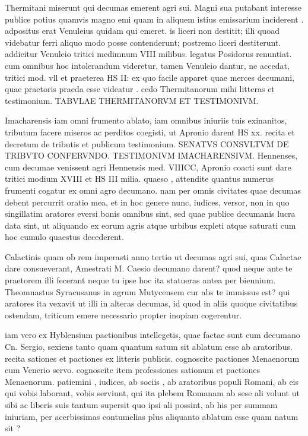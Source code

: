  Thermitani miserunt qui decumas emerent agri sui. Magni sua putabant interesse publice potius quamvis magno emi quam in aliquem istius emissarium inciderent . adpositus erat Venuleius quidam qui emeret. is liceri non destitit; illi quoad videbatur ferri aliquo modo posse contenderunt; postremo liceri destiterunt. addicitur Venuleio tritici medimnum VIII milibus. legatus Posidorus renuntiat. cum omnibus hoc intolerandum videretur, tamen Venuleio dantur, ne accedat, tritici mod. vll et praeterea HS II: ex quo facile apparet quae merces decumani, quae praetoris praeda esse videatur . cedo Thermitanorum mihi litteras et testimonium. TABVLAE THERMITANORVM ET TESTIMONIVM.

 Imacharensis iam omni frumento ablato, iam omnibus iniuriis tuis exinanitos, tributum facere miseros ac perditos coegisti, ut Apronio darent HS xx. recita et decretum de tributis et publicum testimonium. SENATVS CONSVLTVM DE TRIBVTO CONFERVNDO. TESTIMONIVM IMACHARENSIVM. Hennenses, cum decumae venissent agri Hennensis med. VIIICC, Apronio coacti sunt dare tritici modium XVIII et HS III milia. quaeso , attendite quantus numerus frumenti cogatur ex omni agro decumano. nam per omnis civitates quae decumas debent percurrit oratio mea, et in hoc genere nunc, iudices, versor, non in quo singillatim aratores eversi bonis omnibus sint, sed quae publice decumanis lucra data sint, ut aliquando ex eorum agris atque urbibus expleti atque saturati cum hoc cumulo quaestus decederent.

 Calactinis quam ob rem imperasti anno tertio ut decumas agri sui, quas Calactae dare consueverant, Amestrati M. Caesio decumano darent? quod neque ante te praetorem illi fecerant neque tu ipse hoc ita statueras antea per biennium. Theomnastus Syracusanus in agrum Mutycensem cur abs te immissus est? qui aratores ita vexavit ut illi in alteras decumas, id quod in aliis quoque civitatibus ostendam, triticum emere necessario propter inopiam cogerentur.

 iam vero ex Hyblensium pactionibus intellegetis, quae factae sunt cum decumano Cn. Sergio, sexiens tanto quam quantum satum sit ablatum esse ab aratoribus. recita sationes et pactiones ex litteris publicis. cognoscite pactiones Menaenorum cum Venerio servo. cognoscite item professiones sationum et pactiones Menaenorum. patiemini , iudices, ab sociis , ab aratoribus populi Romani, ab eis qui vobis laborant, vobis serviunt, qui ita plebem Romanam ab sese ali volunt ut sibi ac liberis suis tantum supersit quo ipsi ali possint, ab his per summam iniuriam, per acerbissimas contumelias plus aliquanto ablatum esse quam natum sit ?

